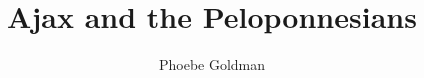 \title{Ajax and the Peloponnesians}
\author{Phoebe Goldman}
\date{}

\newcommand{\theprof}{Prof. Peter Meineck}
\newcommand{\theclass}{Greek Drama}
